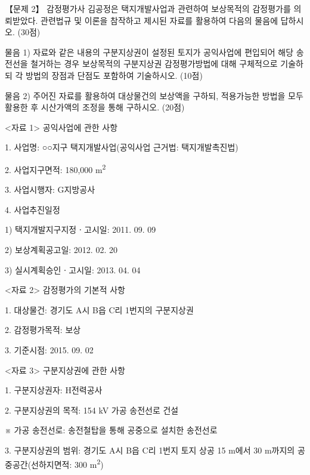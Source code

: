 \begin{longquestion}{【문제 2】}
감정평가사 김공정은 택지개발사업과 관련하여 보상목적의 감정평가를 의뢰받았다. 관련법규 및 이론을 참작하고 제시된 자료를 활용하여 다음의 물음에 답하시오. (30점) \par
\medskip\noindent 물음 1) 자료와 같은 내용의 구분지상권이 설정된 토지가 공익사업에 편입되어 해당 송전선을 철거하는 경우 보상목적의 구분지상권 감정평가방법에 대해 구체적으로 기술하되 각 방법의 장점과 단점도 포함하여 기술하시오. (10점) \par
\medskip\noindent 물음 2) 주어진 자료를 활용하여 대상물건의 보상액을 구하되, 적용가능한 방법을 모두 활용한 후 시산가액의 조정을 통해 구하시오. (20점) \par
<자료 1> 공익사업에 관한 사항 \par
1. 사업명: ○○지구 택지개발사업(공익사업 근거법: 택지개발촉진법) \par
2. 사업지구면적: 180,000 m\textsuperscript{2} \par
3. 사업시행자: G지방공사 \par
4. 사업추진일정 \par
1) 택지개발지구지정ㆍ고시일: 2011. 09. 09 \par
2) 보상계획공고일: 2012. 02. 20 \par
3) 실시계획승인ㆍ고시일: 2013. 04. 04 \par
<자료 2> 감정평가의 기본적 사항 \par
1. 대상물건: 경기도 A시 B읍 C리 1번지의 구분지상권 \par
2. 감정평가목적: 보상 \par
3. 기준시점: 2015. 09. 02 \par
<자료 3> 구분지상권에 관한 사항 \par
1. 구분지상권자: H전력공사 \par
2. 구분지상권의 목적: 154 kV 가공 송전선로 건설 \par
※ 가공 송전선로: 송전철탑을 통해 공중으로 설치한 송전선로 \par
3. 구분지상권의 범위: 경기도 A시 B읍 C리 1번지 토지 상공 15 m에서 30 m까지의 공중공간(선하지면적: 300 m\textsuperscript{2}) \par

\end{longquestion}
